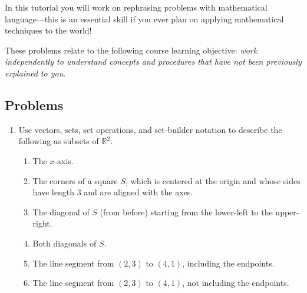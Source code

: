 \documentclass[red]{tutorial}
\newcommand{\R}{\mathbb{R}}
\theoremstyle{definition}
\theoremstyle{theorem}
\begin{document}
	\begin{tutorial}
		\begin{objectives}
			In this tutorial you will work on rephrasing problems
			with mathematical language---this is an essential skill if you ever
			plan on applying mathematical techniques to the world!

			These problems relate to the following course learning
			objective: \textit{work independently to understand concepts and procedures that have not
			been previously explained to you}.
		\end{objectives}



		\subsection*{Problems}


		\begin{enumerate}
			\item Use vectors, sets, set operations, and set-builder notation
				to describe the following as subsets of $\R^2$.
				\begin{enumerate}
					\item The $x$-axis.
					\item The corners of a square $S$, which is centered at the origin and whose
						sides have length 3 and are aligned with the axes.
					\item The diagonal of $S$ (from before) starting from the lower-left to the upper-right.
					\item Both diagonals of $S$.
					\item The line segment from $(2,3)$ to $(4,1)$, including the endpoints.
					\item The line segment from $(2,3)$ to $(4,1)$, not including the endpoints.
				\end{enumerate}


\end{enumerate}
\end{tutorial}
\end{document}
